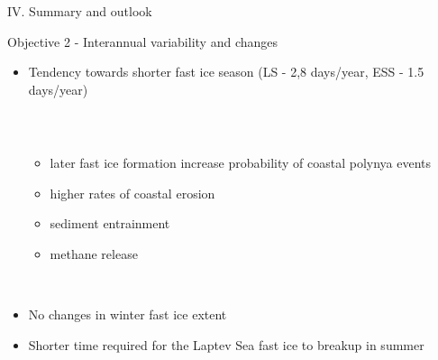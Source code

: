 \documentclass[8pt]{beamer}
\begin{document}
\setwatermark{\fontsize{125pt}{125pt}\selectfont{}}
\begin{frame}{IV. Summary and outlook}
	\begin{block}{Objective 2 - Interannual variability and changes}
		\begin{itemize}
			\item Tendency towards shorter fast ice season (LS - 2,8 days/year, ESS - 1.5 days/year)\\~\\
					\begin{columns}
						\begin{itemize}
							\item later fast ice formation increase probability of coastal polynya events
							\item higher rates of coastal erosion
							\item sediment entrainment
							\item methane release\\~\\
						\end{itemize}			
					\end{columns}
			\item No changes in winter fast ice extent
			\item Shorter time required for the Laptev Sea fast ice to breakup in summer 
		\end{itemize}
	\end{block}
\end{frame}
\end{document}
